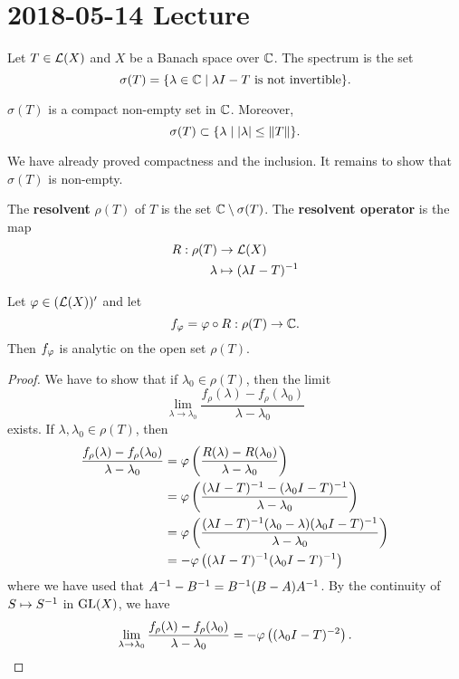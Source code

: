 \section{2018-05-14 Lecture}

Let $T \in \mathcal{L}(X)$ and $X$ be a Banach space over $\mathbb{C}$.
The spectrum is the set
\[ \sigma(T) = \{ \lambda \in \mathbb{C} \mid \lambda I-T \text{ is not invertible} \}. \]

\begin{thm}
  $\sigma(T)$ is a compact non-empty set in $\mathbb{C}$.
  Moreover,
  \[ \sigma(T) \subset \{ \lambda \mid \left\lvert \lambda \right\rvert \leq \left\lVert T \right\rVert \}. \]
\end{thm}

We have already proved compactness and the inclusion.
It remains to show that $\sigma(T)$ is non-empty.

\begin{defn}
  The \textbf{resolvent} $\rho(T)$ of $T$ is the set $\mathbb{C} \setminus \sigma(T)$.
  The \textbf{resolvent operator} is the map
  \begin{align*}
    R: \rho(T) &\to \mathcal{L}(X) \\
    \lambda &\mapsto (\lambda I-T)^{-1}
  \end{align*}
\end{defn}

\begin{lem}
  Let $\varphi \in (\mathcal{L}(X))'$ and let
  \[ f_\varphi = \varphi \circ R: \rho(T) \to \mathbb{C}. \]
  Then $f_\varphi$ is analytic on the open set $\rho(T)$.
\end{lem}

\begin{proof}
  We have to show that if $\lambda_0 \in \rho(T)$, then the limit
  \[ \lim_{\lambda\to\lambda_0} \frac{f_\rho(\lambda)-f_\rho(\lambda_0)}{\lambda-\lambda_0} \]
  exists.
  If $\lambda,\lambda_0 \in \rho(T)$, then
  \begin{align*}
    \frac{f_\rho(\lambda)-f_\rho(\lambda_0)}{\lambda-\lambda_0} &= \varphi\left( \frac{R(\lambda)-R(\lambda_0)}{\lambda-\lambda_0} \right) \\
    &= \varphi\left( \frac{(\lambda I-T)^{-1}-(\lambda_0I-T)^{-1}}{\lambda-\lambda_0} \right) \\
    &= \varphi\left( \frac{(\lambda I-T)^{-1}(\lambda_0-\lambda)(\lambda_0I-T)^{-1}}{\lambda-\lambda_0} \right) \\
    &= -\varphi\left( (\lambda I-T)^{-1}(\lambda_0I-T)^{-1} \right)
  \end{align*}
  where we have used that $A^{-1}-B^{-1}=B^{-1}(B-A)A^{-1}$.
  By the continuity of $S \mapsto S^{-1}$ in $\operatorname{GL}(X)$, we have
  \[ \lim_{\lambda\to\lambda_0} \frac{f_\rho(\lambda)-f_\rho(\lambda_0)}{\lambda-\lambda_0} = -\varphi\left( (\lambda_0I-T)^{-2} \right). \qedhere \]
\end{proof}

